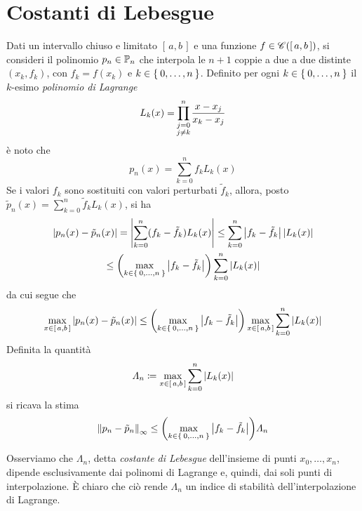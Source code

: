 \section{Costanti di Lebesgue}
	
	\noindent Dati un intervallo chiuso e limitato \([\, a, b \,]\) e una funzione \(f \in \cont ([\, a, b \,])\), si consideri il polinomio \(p_n \in \P_n\) che interpola le \(n + 1\) coppie a due a due distinte \((x_k, f_k)\), con \(f_k = f (x_k)\) e \(k \in \Set{0, \dots, n}\). Definito per ogni \(k \in \Set{0, \dots, n}\) il \(k\)-esimo \emph{polinomio di Lagrange}
	\begin{equation}\label{eq:polin-lagrange}
		L_k (x) = \prod_{\mathclap{\substack{j = 0 \\ j \ne k}}}^n \frac{x - x_j}{x_k - x_j}
	\end{equation}
	è noto che
	\begin{equation}\label{eq:polin-interp}
		p_n (x) = \sum_{k = 0}^n f_k L_k (x)
	\end{equation}
	Se i valori \(f_k\) sono sostituiti con valori perturbati \(\tilde{f}_k\), allora, posto \(\tilde{p}_n (x) = \sum_{k = 0}^n \tilde{f}_k L_k (x)\), si ha
	\begin{multline*}
		\abs{p_n (x)  - \tilde{p}_n (x)} = \abs{\sum_{k = 0}^n (f_k - \tilde{f}_k) L_k (x)} \le \sum_{k = 0}^n \abs{f_k - \tilde{f}_k} \, \abs{L_k (x)} \\
		\le \qty(\max_{k \in \Set{0, \dots, n}} \abs{f_k - \tilde{f}_k}) \sum_{k = 0}^n \abs{L_k (x)}
	\end{multline*}
	da cui segue che
	\begin{equation*}
		\max_{x \in [\, a, b \,]} \abs{p_n (x)  - \tilde{p}_n (x)} \le \qty(\max_{k \in \Set{0, \dots, n}} \abs{f_k - \tilde{f}_k}) \max_{x \in [\, a, b \,]} \sum_{k = 0}^n \abs{L_k (x)}
	\end{equation*}
	Definita la quantità
	\begin{equation}\label{eq:cost-lebesgue}
		\varLambda_n \coloneqq \max_{x \in [\, a, b \,]} \sum_{k = 0}^n \abs{L_k (x)}
	\end{equation}
	si ricava la stima
	\begin{equation}\label{eq:errore-cost-lebesgue}
		\norm{p_n - \tilde{p}_n}_\infty \le \qty(\max_{k \in \Set{0, \dots, n}} \abs{f_k - \tilde{f}_k}) \varLambda_n
	\end{equation}

	Osserviamo che \(\varLambda_n\), detta \emph{costante di Lebesgue} dell'insieme di punti \(x_0, \dots, x_n\), dipende esclusivamente dai polinomi di Lagrange e, quindi, dai soli punti di interpolazione. È chiaro che ciò rende \(\varLambda_n\) un indice di stabilità dell'interpolazione di Lagrange.
	
